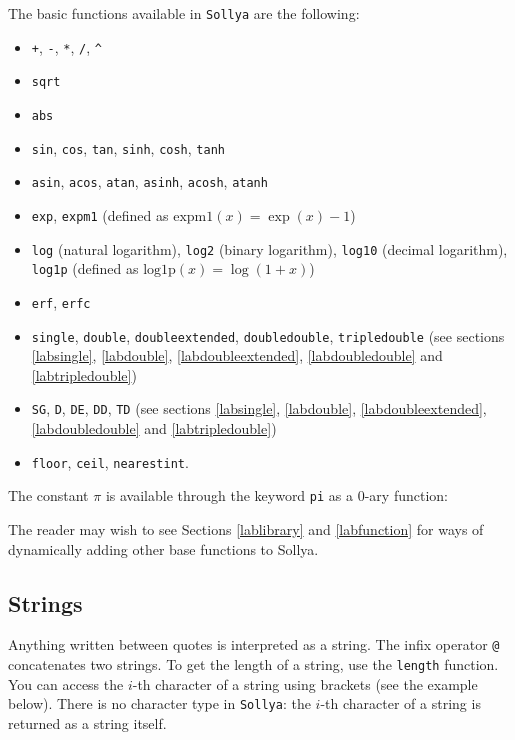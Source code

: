 \documentclass[a4paper]{article}
\newcommand{\com}[1]{\texttt{#1}}
\newcommand{\key}[1]{\texttt{#1}}
\newcommand{\sollya}{\texttt{Sollya}\xspace}
\begin{document}
The basic functions available in \sollya are the following:
\begin{itemize}
\item \com{+}, \com{-}, \com{*}, \com{/}, \com{\^{}}
\item \com{sqrt}
\item \com{abs}
\item \com{sin}, \com{cos}, \com{tan}, \com{sinh}, \com{cosh}, \com{tanh}
\item \com{asin}, \com{acos}, \com{atan}, \com{asinh}, \com{acosh}, \com{atanh}
\item \com{exp}, \com{expm1} (defined as $\mathrm{expm1}(x) = \exp(x)-1$)
\item \com{log} (natural logarithm), \com{log2} (binary logarithm), \com{log10} (decimal logarithm), \com{log1p} (defined as $\mathrm{log1p}(x) = \log(1+x)$)
\item \com{erf}, \com{erfc}
\item \com{single}, \com{double}, \com{doubleextended}, \com{doubledouble}, \com{tripledouble} (see sections \ref{labsingle}, \ref{labdouble}, \ref{labdoubleextended}, \ref{labdoubledouble} and \ref{labtripledouble})
\item \com{SG}, \com{D}, \com{DE}, \com{DD}, \com{TD} (see sections \ref{labsingle}, \ref{labdouble}, \ref{labdoubleextended}, \ref{labdoubledouble} and \ref{labtripledouble})
\item \com{floor}, \com{ceil}, \com{nearestint}.
\end{itemize}

The constant $\pi$ is available through the keyword \key{pi} as a $0$-ary function: 



The reader may wish to see Sections \ref{lablibrary} and \ref{labfunction} for ways of dynamically adding other base functions to Sollya.

\subsection{Strings}
Anything written between quotes is interpreted as a string. The infix operator \com{@} concatenates two strings. To get the length of a string, use the \com{length} function. You can access the $i$-th character of a string using brackets (see the example below). There is no character type in \sollya: the $i$-th character of a string is returned as a string itself.


\end{document}
